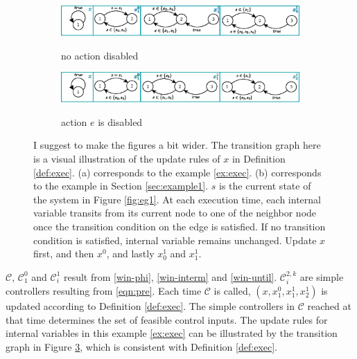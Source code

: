 \begin{example}
	\begin{figure}
		\centering
		\begin{subfigure}[b]{1\textwidth}
				\centering
				\includegraphics[width=0.85\linewidth]{pic/xupdate}
				\label{fig:xupdate1}
				\caption{no action disabled}
		\end{subfigure}
		\begin{subfigure}[b]{1\textwidth}
			\centering
			\includegraphics[width=0.85\linewidth]{pic/xupdate2}
			\label{fig:xupdate2}
			\caption{ action $ e $ is disabled}
		\end{subfigure}
		\caption{ %
            {\color{purple} I suggest to make the figures a bit wider.}
			The transition graph here is a visual illustration of the update rules of $ x $ in Definition \ref{def:exec}. (a) corresponds to the example \ref{ex:exec}. (b) corresponds to the example in Section \ref{sec:example1}. $s $ is the current state of the system in Figure \ref{fig:eg1}. At each execution time, each internal variable transits from its current node to one of the neighbor node once the transition condition on the edge is satisfied. If no transition condition is satisfied, internal variable remains unchanged. Update $ x$ first, and then $ x^0 $, and lastly $ x_0^1 $ and $x^1_1 $.} 
		\label{fig:xupdate}
	\end{figure}
	
	$ \mathcal{C} $, $ \mathcal{C}_1^0 $ and $ \mathcal{C}_i^1 $ result from \eqref{win-phi}, \eqref{win-interm} and \eqref{win-until}. $ \mathcal{C}_i^{2,k} $ are simple controllers resulting from \eqref{eqn:pre}. Each time $ \mathcal{C} $ is called, $ (x,x^0_1,x^1_1,x^1_2) $ is updated according to Definition \ref{def:exec}. The simple controllers in $ \mathcal{C} $ reached at that time determines the set of feasible control inputs. The update rules for internal variables in this example \ref{ex:exec} can be illustrated by the transition graph in Figure \ref{fig:xupdate}, which is consistent with Definition \ref{def:exec}. %
	

\end{example}
